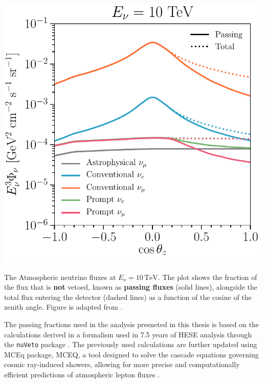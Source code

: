 \begin{marginfigure}
	\includegraphics{./figures/EventSample/fig1_fluxes_10.pdf}
	\caption{The Atmospheric neutrino fluxes at \( E_\nu = 10 \, \text{TeV} \). The plot shows the fraction of the flux that is \textbf{not} vetoed, known as \textbf{passing fluxes} (solid lines), alongside the total flux entering the detector (dashed lines) as a function of the cosine of the zenith angle. Figure is adapted from \cite{pass_frac}.}
\end{marginfigure}
The passing fractions used in the analysis presneted in this thesis is based on the calculations derived in  a formalism used in 7.5 years of HESE analysis \cite{HESE7_sample} through the \texttt{nuVeto} package . The previously used calculations are further updated using MCEq package, MCEQ, a tool designed to solve the cascade equations governing cosmic ray-induced showers, allowing for more precise and computationally efficient predictions of atmospheric lepton fluxes . 
